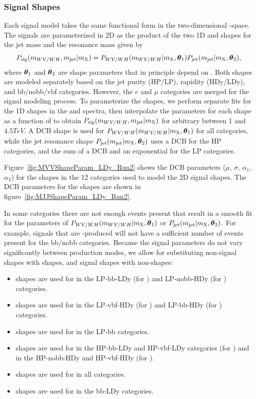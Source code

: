 \subsubsection{Signal Shapes}

Each signal model takes the same functional form in the two-dimensional \MJ-\MVV space.
The signals are parameterized in 2D as the product of the two 1D \MJ and \MVV shapes for the jet mass and the resonance mass given by
\begin{equation}
  P_\mathrm{sig}(m_{WV/WH},m_\mathrm{jet}|m_\mathrm{X})=P_{WV/WH}(m_{WV/WH}|m_\mathrm{X},\vb*{\theta}_1)P_\mathrm{jet}(m_\mathrm{jet}|m_\mathrm{X},\vb*{\theta}_2),
\end{equation}
where $\vb*{\theta}_1$ and $\vb*{\theta}_2$ are shape parameters that in principle depend on \MX.
Both shapes are modeled separately based on the jet purity (HP/LP), rapidity (HDy/LDy), and bb/nobb/vbf categories.
However, the $e$ and $\mu$ categories are merged for the signal modeling process.
To parameterize the shapes, we perform separate fits for the 1D shapes in the \MVV and \MJ spectra, then interpolate the parameters for each shape as a function of \MX to obtain $P_\mathrm{sig}(m_{WV/WH},m_\mathrm{jet}|m_\mathrm{X})$ for arbitrary \MX between 1 and $4.5\unit{TeV}$.
A DCB shape is used for $P_{WV/WH}(m_{WV/WH}|m_\mathrm{X},\vb*{\theta}_1)$ for all categories, while the jet resonance shape $P_\mathrm{jet}(m_\mathrm{jet}|m_\mathrm{X},\vb*{\theta}_2)$ uses a DCB for the HP categories, and the sum of a DCB and an exponential for the LP categories.

Figure~\ref{fig:MVVShapeParam_LDy_Run2} shows the DCB parameters ($\mu$, $\sigma$, $\alpha_1$, $\alpha_2$) for the \MVV shapes in the 12 categories used to model the 2D signal shapes.
The DCB parameters for the \MJ shapes are shown in figure~\ref{fig:MJJShapeParam_LDy_Run2}.

In some categories there are not enough events present that result in a smooth fit for the parameters of $P_{WV/WH}(m_{WV/WH}|m_\mathrm{X},\vb*{\theta}_1)$ or $P_\mathrm{jet}(m_\mathrm{jet}|m_\mathrm{X},\vb*{\theta}_2)$.
For example, signals that are \VBF-produced will not have a sufficient number of events present for the bb/nobb categories.
Because the signal parameters do not vary significantly between production modes, we allow for substituting non-\VBF signal shapes with \VBF shapes, and \VBF signal shapes with non-\VBF shapes:
\begin{itemize}
  \item \DY\WprtoWZ shapes are used for \VBF\WprtoWZ in the LP-bb-LDy (for \MJ) and LP-nobb-HDy (for \MVV) categories.
  \item \VBF\WprtoWZ shapes are used for \DY\WprtoWZ in the LP-vbf-HDy (for \MJ) and LP-bb-HDy (for \MVV) categories.
  \item \ggF\RadtoWW shapes are used for \VBF\RadtoWW in the LP-bb categories.
  \item \ggF\GBulktoWW shapes are used for \VBF\GBulktoWW in the HP-bb-LDy and HP-vbf-LDy categories (for \MJ) and in the HP-nobb-HDy and HP-vbf-HDy (for \MVV).
  \item \ggF\GBulktoWW shapes are used for \DY\ZprtoWW in all categories.
  \item \ggF\GBulktoWW shapes are used for \VBF\ZprtoWW in the bb-LDy categories.
\end{itemize}

